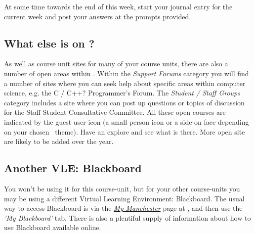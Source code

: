 At some time towards the end of this week, start your journal entry for the current week and post your answers at the prompts provided.

\subsection{What else is on \moodle?}
\label{sec:what-else-moodle}


As well as course unit sites for many of your course units, there are also a number of open areas within \moodle. Within the \emph{Support Forums} category you will find a number of sites where you can seek help about specific areas within computer science, e.g. the C / C++? Programmer's Forum. The \emph{Student / Staff Groups} category includes a site where you can post up questions or topics of discussion for the Staff Student Consultative Committee. All these open courses are indicated by the guest user icon (a small person icon or a side-on face depending on your chosen \moodle\ theme). Have an explore and see what is there. More open site are likely to be added over the year.









\subsection{Another VLE: Blackboard}
\label{sec:blackboard}

You won't be using it for this course-unit, but for your other course-units you may be using a different Virtual Learning Environment: \textsf{Blackboard}. The usual way to access \textsf{Blackboard} is via the \href{https://my.manchester.ac.uk}{\emph{My Manchester}} page at , and then use the \emph{'My Blackboard'} tab. There is also a plentiful supply of information about how to use Blackboard available online. 

